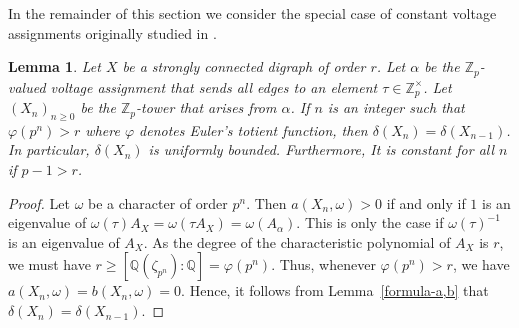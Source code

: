 \documentclass[11pt]{amsart}
\newtheorem{lemma}[theorem]{Lemma}
\numberwithin{equation}{section}
\theoremstyle{remark}
\newcommand{\?}{\stackrel{?}{=}}
\newcommand{\Zp}{\mathbb{Z}_p}
\newcommand{\Q}{\mathbb{Q}}
\begin{document}
In the remainder of this section we consider the special case of constant voltage assignments originally studied in \cite{constant-voltage}.
\begin{lemma}
\label{defec-constant-voltage}
Let $X$ be a strongly connected digraph of order $r$. Let $\alpha$ be the $\Zp$-valued voltage assignment that sends all edges to an element $\tau\in\Zp^\times$. Let $(X_n)_{n\ge0}$ be the $\Zp$-tower that arises from $\alpha$. If $n$ is an integer such that $\varphi(p^n)>r$ where $\varphi$ denotes Euler's totient function, then $\delta(X_n)=\delta(X_{n-1})$. In particular, $\delta(X_n)$ is uniformly bounded. Furthermore, It is constant for all $n$ if $p-1>r$. 
\end{lemma}
\begin{proof}
    Let $\omega$ be a character of order $p^n$. Then $a(X_n,\omega)>0$ if and only if $1$ is an eigenvalue of $\omega(\tau)A_X=\omega(\tau A_X)=\omega(A_\alpha)$. This is only the case if $\omega(\tau)^{-1}$ is an eigenvalue of $A_X$. As the degree of the characteristic polynomial of $A_X$ is $r$, we must have $r\ge[\Q(\zeta_{p^{n}}):\Q]=\varphi(p^n) $. Thus, whenever $\varphi(p^n)>r$, we have $a(X_n,\omega)=b(X_n,\omega)=0$. Hence, it follows from Lemma~\ref{formula-a,b} that  $\delta(X_n)=\delta(X_{n-1})$.
\end{proof}
\end{document}
